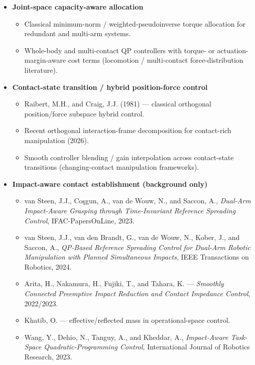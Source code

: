 \documentclass[conference]{IEEEtran}
\begin{document}
\begin{itemize}
    \item \textbf{Joint-space capacity-aware allocation}
    \begin{itemize}
        \item Classical minimum-norm / weighted-pseudoinverse torque allocation for redundant and multi-arm systems.
        \item Whole-body and multi-contact QP controllers with torque- or actuation-margin-aware cost terms (locomotion / multi-contact force-distribution literature).
    \end{itemize}

    \item \textbf{Contact-state transition / hybrid position-force control}
    \begin{itemize}
        \item Raibert, M.H., and Craig, J.J. (1981) --- classical orthogonal position/force subspace hybrid control.
        \item Recent orthogonal interaction-frame decomposition for contact-rich manipulation (2026).
        \item Smooth controller blending / gain interpolation across contact-state transitions (changing-contact manipulation frameworks).
    \end{itemize}

    \item \textbf{Impact-aware contact establishment (background only)}
    \begin{itemize}
        \item van Steen, J.J., Coşgun, A., van de Wouw, N., and Saccon, A., \emph{Dual-Arm Impact-Aware Grasping through Time-Invariant Reference Spreading Control}, IFAC-PapersOnLine, 2023.
        \item van Steen, J.J., van den Brandt, G., van de Wouw, N., Kober, J., and Saccon, A., \emph{QP-Based Reference Spreading Control for Dual-Arm Robotic Manipulation with Planned Simultaneous Impacts}, IEEE Transactions on Robotics, 2024.
        \item Arita, H., Nakamura, H., Fujiki, T., and Tahara, K. --- \emph{Smoothly Connected Preemptive Impact Reduction and Contact Impedance Control}, 2022/2023.
        \item Khatib, O. --- effective/reflected mass in operational-space control.
        \item Wang, Y., Dehio, N., Tanguy, A., and Kheddar, A., \emph{Impact-Aware Task-Space Quadratic-Programming Control}, International Journal of Robotics Research, 2023.
    \end{itemize}
\end{itemize}



\end{document}
